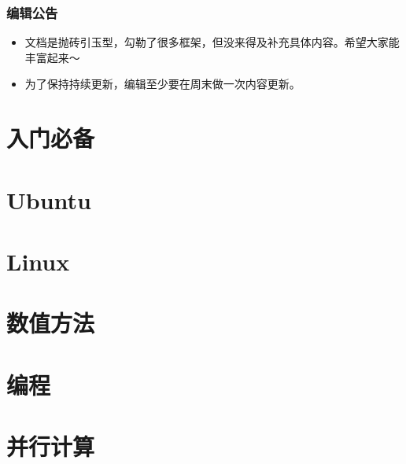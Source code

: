 \documentclass[cn,11pt,chinese,twoside]{elegantbook}
\begin{document}
\section*{编辑公告}
\begin{itemize}
\item 文档是抛砖引玉型，勾勒了很多框架，但没来得及补充具体内容。希望大家能丰富起来～
\item 为了保持持续更新，编辑至少要在周末做一次内容更新。
\end{itemize}





\part{入门必备}


\part{Ubuntu}


\part{Linux}





\part{数值方法}


\part{编程}



\part{并行计算}

\end{document}
